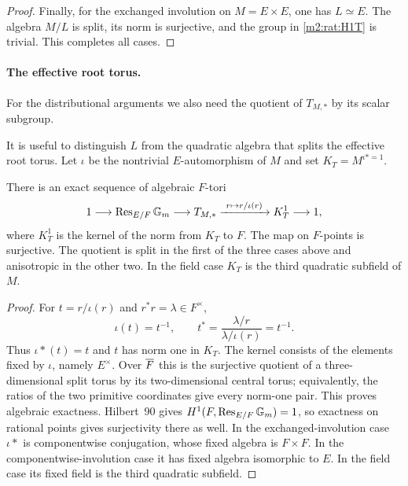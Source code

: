 \begin{proof}
Finally, for the exchanged involution on $M=E\times E$,
one has $L\simeq E$. The algebra $M/L$ is split, its norm
is surjective, and the group in \eqref{m2:rat:H1T} is trivial.
This completes all cases.
\end{proof}

\paragraph{The effective root torus.}

For the distributional arguments we also need the quotient of
$T_{M,*}$ by its scalar subgroup.

It is useful to distinguish $L$ from the quadratic algebra that
splits the effective root torus.  Let $\iota$ be the nontrivial
$E$-automorphism of $M$ and set
$K_T=M^{\iota *=1}$.

\begin{lemma}\label{m2:rat:adjoint-torus}
There is an exact sequence of algebraic $F$-tori
\begin{equation}\label{m2:rat:root-sequence}
 1\longrightarrow\operatorname{Res}_{E/F}\mathbb G_m
 \longrightarrow T_{M,*}
 \xrightarrow{\ r\mapsto r/\iota(r)\ }K_T^1
 \longrightarrow1,
\end{equation}
where $K_T^1$ is the kernel of the norm from $K_T$ to $F$.
The map on $F$-points is surjective.  The quotient is split in
the first of the three cases above and anisotropic in the other
two.  In the field case $K_T$ is the third quadratic subfield
   of $M$.
\end{lemma}

\begin{proof}
For $t=r/\iota(r)$ and $r^*r=\lambda\in F^\times$,
\[
 \iota(t)=t^{-1},\qquad
 t^*=\frac{\lambda/r}{\lambda/\iota(r)}=t^{-1}.
\]
Thus $\iota *(t)=t$ and $t$ has norm one in $K_T$.
The kernel consists of the elements fixed by $\iota$, namely
$E^\times$.  Over $\overline F$ this is the surjective quotient
of a three-dimensional split torus by its two-dimensional
central torus; equivalently, the ratios of the two primitive
coordinates give every norm-one pair.  This proves algebraic
exactness.  Hilbert~90 gives
$H^1(F,\operatorname{Res}_{E/F}\mathbb G_m)=1$, so exactness on rational points
gives surjectivity there as well.  In the exchanged-involution
case $\iota *$ is componentwise conjugation, whose fixed
algebra is $F\times F$.  In the componentwise-involution
case it has fixed algebra isomorphic to $E$.  In the field
case its fixed field is the third quadratic subfield.
\end{proof}

